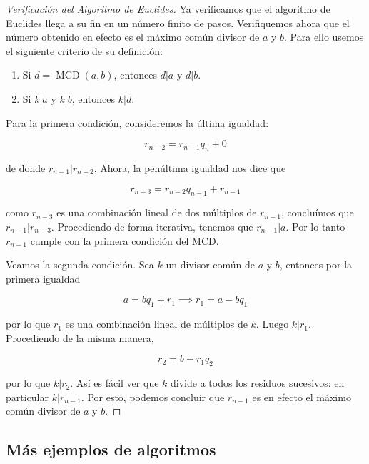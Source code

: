 \begin{proof}[Verificación del Algoritmo de Euclides]
    Ya verificamos que el algoritmo de Euclides llega a su fin en un número finito de pasos. Verifiquemos ahora que el número obtenido en efecto es el máximo común divisor de $a$ y $b$. Para ello usemos el siguiente criterio de su definición:
    
    \begin{enumerate}
        \item Si $d = \operatorname{MCD}(a,b)$, entonces $d|a$ y $d|b$.
        \item Si $k|a$ y $k|b$, entonces $k|d$.
    \end{enumerate}
    
    Para la primera condición, consideremos la última igualdad:
    
    \[
    r_{n-2} = r_{n-1}q_n + 0
    \]
    
    \noindent de donde $r_{n-1}|r_{n-2}$. Ahora, la penúltima igualdad nos dice que
    
    \[
    r_{n-3} = r_{n-2}q_{n-1} + r_{n-1}
    \]
    
    \noindent como $r_{n-3}$ es una combinación lineal de dos múltiplos de $r_{n-1}$, concluímos que $r_{n-1}|r_{n-3}$. Procediendo de forma iterativa, tenemos que $r_{n-1}|a$. Por lo tanto $r_{n-1}$ cumple con la primera condición del MCD.
    
    Veamos la segunda condición. Sea $k$ un divisor común de $a$ y $b$, entonces por la primera igualdad
    
    \[
    a = bq_1 + r_1 \implies r_1 = a - bq_1
    \]
    
    \noindent por lo que $r_1$ es una combinación lineal de múltiplos de $k$. Luego $k|r_1$. Procediendo de la misma manera,
    
    \[
    r_2 = b - r_1q_2
    \]
    
    \noindent por lo que $k|r_2$. Así es fácil ver que $k$ divide a todos los residuos sucesivos: en particular $k|r_{n-1}$. Por esto, podemos concluir que $r_{n-1}$ es en efecto el máximo común divisor de $a$ y $b$.
\end{proof}

\subsection{Más ejemplos de algoritmos}

